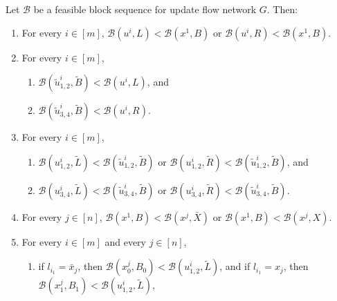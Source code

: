 \documentclass[fontsize=11pt,paper=a4]{book}
\begin{document}
\begin{lem}
Let \(\mathcal{B}\) be a feasible block sequence for update flow network \(G\).
Then:

\begin{enumerate}
\item \label{itm:lem-feasible-block-sequence-properties-1}
For every \(i\in[m]\), \(\mathcal{B}(u^i,L)<\mathcal{B}(x^1,B)\) or \(\mathcal{B}(u^i,R)<\mathcal{B}(x^1,B)\).

\item \label{itm:lem-feasible-block-sequence-properties-2}
For every \(i\in[m]\),

\begin{enumerate}
\item \label{itm:lem-feasible-block-sequence-properties-2-1}
\(\mathcal{B}(\tilde{u}_{1,2}^i,\tilde{B})<\mathcal{B}(u^i,L)\), and

\item \label{itm:lem-feasible-block-sequence-properties-2-2}
\(\mathcal{B}(\tilde{u}_{3,4}^i,\tilde{B})<\mathcal{B}(u^i,R)\).
\end{enumerate}

\item \label{itm:lem-feasible-block-sequence-properties-3}
For every \(i\in[m]\),

\begin{enumerate}
\item \label{itm:lem-feasible-block-sequence-properties-3-1}
\(\mathcal{B}(u_{1,2}^i,\tilde{L})<\mathcal{B}(\tilde{u}_{1,2}^i,\tilde{B})\) or \(\mathcal{B}(u_{1,2}^i,\tilde{R})<\mathcal{B}(\tilde{u}_{1,2}^i,\tilde{B})\), and

\item \label{itm:lem-feasible-block-sequence-properties-3-2}
\(\mathcal{B}(u_{3,4}^i,\tilde{L})<\mathcal{B}(\tilde{u}_{3,4}^i,\tilde{B})\) or \(\mathcal{B}(u_{3,4}^i,\tilde{R})<\mathcal{B}(\tilde{u}_{3,4}^i,\tilde{B})\).
\end{enumerate}

\item \label{itm:lem-feasible-block-sequence-properties-4}
For every \(j\in[n]\), \(\mathcal{B}(x^1,B)<\mathcal{B}(x^j,\bar{X})\) or \(\mathcal{B}(x^1,B)<\mathcal{B}(x^j,X)\).

\item \label{itm:lem-feasible-block-sequence-properties-5}
For every \(i\in[m]\) and every \(j\in[n]\),

\begin{enumerate}
\item \label{itm:lem-feasible-block-sequence-properties-5-1}
if \(l_{i_1}=\bar{x}_j\), then \(\mathcal{B}(x_0^j,B_0)<\mathcal{B}(u_{1,2}^i,\tilde{L})\), and if \(l_{i_1}=x_j\), then \(\mathcal{B}(x_1^j,B_1)<\mathcal{B}(u_{1,2}^i,\tilde{L})\),


\end{enumerate}
\end{enumerate}
\end{lem}
\end{document}
